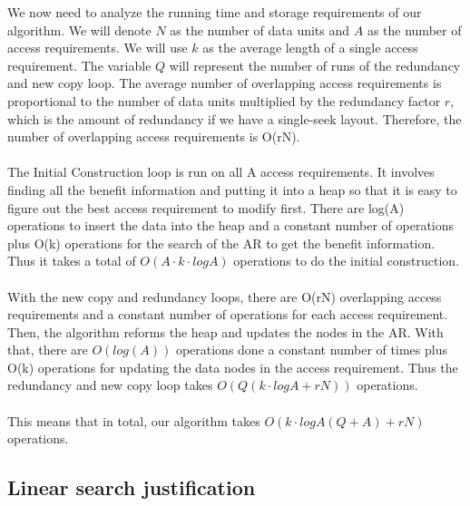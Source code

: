 \documentclass[conference]{acmsiggraph}
\begin{document}
We now need to analyze the running time and storage requirements of our algorithm. We will denote $N$ as the number of data units and $A$ as the number of access requirements. We will use $k$ as the average length of a single access requirement. The variable $Q$ will represent the number of runs of the redundancy and new copy loop. The average number of overlapping access requirements is proportional to the number of data units multiplied by the redundancy factor $r$, which is the amount of redundancy if we have a single-seek layout. Therefore, the number of overlapping access requirements is O(rN). \\
\\
The Initial Construction loop is run on all A access requirements. It involves finding all the benefit information and putting it into a heap so that it is easy to figure out the best access requirement to modify first. There are log(A) operations to insert the data into the heap and a constant number of operations plus O(k) operations for the search of the AR to get the benefit information. Thus it takes a total of $O(A \cdot k \cdot logA)$ operations to do the initial construction. \\
\\
With the new copy and redundancy loops, there are O(rN) overlapping access requirements and a constant number of operations for each access requirement. Then, the algorithm reforms the heap and updates the nodes in the AR. With that, there are $O(log(A))$ operations done a constant number of times plus O(k) operations for updating the data nodes in the access requirement. Thus the redundancy and new copy loop takes $O(Q(k \cdot logA + rN))$ operations. \\
\\
This means that in total, our algorithm takes $O( k \cdot logA (Q+A) + rN)$ operations. 

\subsection{Linear search justification}
\end{document}
